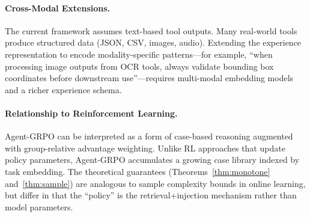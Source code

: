 \paragraph{Cross-Modal Extensions.}
The current framework assumes text-based tool outputs. Many real-world tools
produce structured data (JSON, CSV, images, audio). Extending the experience
representation to encode modality-specific patterns---for example, ``when
processing image outputs from OCR tools, always validate bounding box
coordinates before downstream use''---requires multi-modal embedding models
and a richer experience schema.

\paragraph{Relationship to Reinforcement Learning.}
Agent-GRPO can be interpreted as a form of case-based reasoning augmented with
group-relative advantage weighting. Unlike RL approaches that update policy
parameters, Agent-GRPO accumulates a growing case library indexed by task
embedding. The theoretical guarantees (Theorems~\ref{thm:monotone}
and~\ref{thm:sample}) are analogous to sample complexity bounds in online
learning, but differ in that the ``policy'' is the retrieval+injection
mechanism rather than model parameters.

